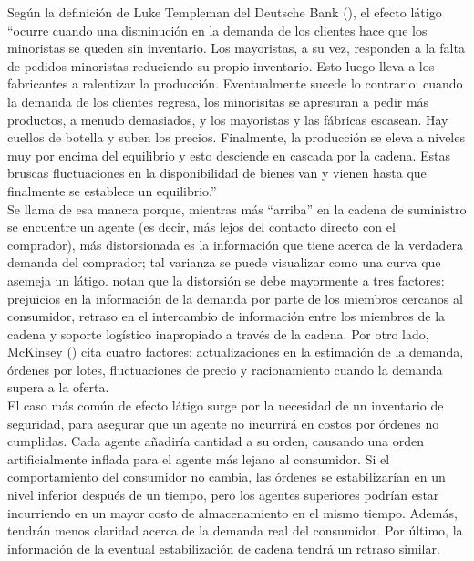 Seg\'un la definici\'on de Luke Templeman del Deutsche Bank (\cite{bloombullwhip}), el efecto l\'atigo ``ocurre cuando una disminuci\'on en la demanda de los clientes hace que los minoristas se queden sin inventario. Los mayoristas, a su vez, responden a la falta de pedidos minoristas reduciendo su propio inventario. Esto luego lleva a los fabricantes a ralentizar la producci\'on. Eventualmente sucede lo contrario: cuando la demanda de los clientes regresa, los minorisitas se apresuran a pedir m\'as productos, a menudo demasiados, y los mayoristas y las f\'abricas escasean. Hay cuellos de botella y suben los precios. Finalmente, la producci\'on se eleva a niveles muy por encima del equilibrio y esto desciende en cascada por la cadena. Estas bruscas fluctuaciones en la disponibilidad de bienes van y vienen hasta que finalmente se establece un equilibrio.''\\

Se llama de esa manera porque, mientras m\'as ``arriba'' en la cadena de suministro se encuentre un agente (es decir, m\'as lejos del contacto directo con el comprador), m\'as distorsionada es la informaci\'on que tiene acerca de la verdadera demanda del comprador; tal varianza se puede visualizar como una curva que asemeja un l\'atigo. \citet{Chaharsooghi} notan que la distorsi\'on se debe mayormente a tres factores: prejuicios en la informaci\'on de la demanda por parte de los miembros cercanos al consumidor, retraso en el intercambio de informaci\'on entre los miembros de la cadena y soporte log\'istico inapropiado a trav\'es de la cadena. Por otro lado, McKinsey (\citet{mckbullwhip}) cita cuatro factores: actualizaciones en la estimaci\'on de la demanda, \'ordenes por lotes, fluctuaciones de precio y racionamiento cuando la demanda supera a la oferta.\\

El caso m\'as com\'un de efecto l\'atigo surge por la necesidad de un inventario de seguridad, para asegurar que un agente no incurrir\'a en costos por \'ordenes no cumplidas. Cada agente a\~nadir\'ia cantidad a su orden, causando una orden artificialmente inflada para el agente m\'as lejano al consumidor. Si el comportamiento del consumidor no cambia, las \'ordenes se estabilizar\'ian en un nivel inferior despu\'es de un tiempo, pero los agentes superiores podr\'ian estar incurriendo en un mayor costo de almacenamiento en el mismo tiempo. Adem\'as, tendr\'an menos claridad acerca de la demanda real del consumidor. Por \'ultimo, la informaci\'on de la eventual estabilizaci\'on de cadena tendr\'a un retraso similar.\\

